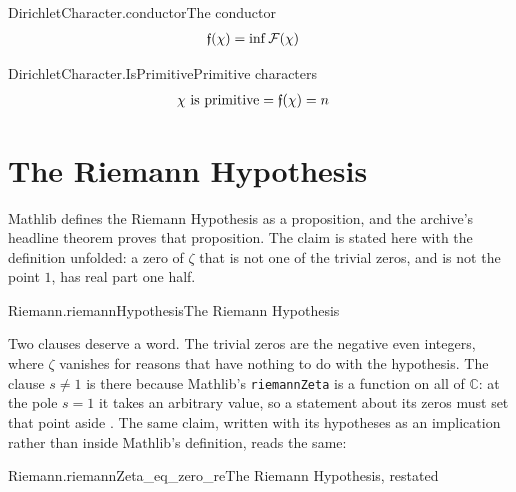 \documentclass{article}
\begin{document}
\begin{leandefinition}[def, sum=azhYsWmuoI]{DirichletCharacter.conductor}{The conductor}
\label{def:DirichletCharacter.conductor}
\[\LeanMath{\begin{aligned}\mathfrak{f}(\chi) &= \inf \mathcal{F}(\chi)\end{aligned}}\]
\end{leandefinition}

\begin{leandefinition}[def, sum=bJp4mTHNBt]{DirichletCharacter.IsPrimitive}{Primitive characters}
\label{def:DirichletCharacter.IsPrimitive}
\[\LeanMath{\begin{aligned}\chi \text{ is primitive} &= \mathfrak{f}(\chi) = n\end{aligned}}\]
\end{leandefinition}

\section{The Riemann Hypothesis}

Mathlib defines the Riemann Hypothesis as a proposition, and the archive's
headline theorem proves that proposition. The claim is stated here with the
definition unfolded: a zero of $\zeta$ that is not one of the trivial zeros,
and is not the point $1$, has real part one half.

\begin{leanclaim}[claim, unfold, sum=aBK3Bzh1sJ]{Riemann.riemannHypothesis}{The Riemann Hypothesis}
\label{claim:Riemann.riemannHypothesis}
\end{leanclaim}

Two clauses deserve a word. The trivial zeros are the negative even integers,
where $\zeta$ vanishes for reasons that have nothing to do with the
hypothesis. The clause $s \ne 1$ is there because Mathlib's
\texttt{riemannZeta} is a function on all of $\mathbb{C}$: at the pole $s = 1$
it takes an arbitrary value, so a statement about its zeros must set that
point aside . The same claim,
written with its hypotheses as an implication rather than inside Mathlib's
definition, reads the same:

\begin{leanclaim}[claim, sum=Rmv4sdef3i]{Riemann.riemannZeta_eq_zero_re}{The Riemann Hypothesis, restated}
\label{claim:Riemann.riemannZeta_eq_zero_re}
\end{leanclaim}
\end{document}

